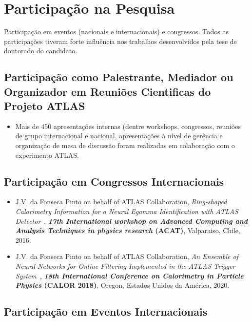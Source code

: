 

\section{Participação na Pesquisa}

Participação em eventos (nacionais e internacionais) e congressos. Todos as participações tiveram forte influência nos trabalhos desenvolvidos pela tese de doutorado do candidato.

\subsection{Participação como Palestrante, Mediador ou Organizador em Reuniões Cientificas do Projeto ATLAS}

\begin{itemize}

\item Mais de 450 apresentações internas (dentre workshops, congressos, reuniões de grupo internacional e nacional, apresentações à nível de gerência e organização de mesa de discussão foram realizadas em colaboração com o experimento ATLAS.

\end{itemize}

\subsection{Participação em Congressos Internacionais}

\begin{itemize}

\item  J.V. da Fonseca Pinto on behalf of ATLAS Collaboration, \emph{Ring-shaped Calorimetry Information for a Neural Egamma Identification with ATLAS Detector}~\cite{daFonsecaPinto:2016ago}, \textbf{\emph{ 17th International workshop on Advanced Computing and Analysis Techniques in physics research} (ACAT)}, Valparaiso, Chile, 2016.

\item J.V. da Fonseca Pinto  on behalf of ATLAS Collaboration, \emph{An Ensemble of Neural Networks for Online Filtering Implemented in the ATLAS Trigger System}~\cite{daFonsecaPinto:2019jlf}, \textbf{\emph{18th International Conference on Calorimetry in Particle Physics} (CALOR 2018)}, Oregon, Estados Unidos da América, 2020.
\end{itemize}

\subsection{Participação em Eventos Internacionais}

